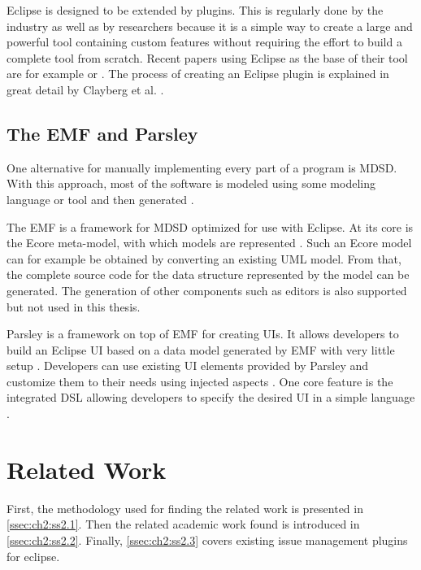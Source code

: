 Eclipse is designed to be extended by plugins. This is regularly done by the industry as well as by researchers 
because it is a simple way to create a large and powerful tool containing custom features 
without requiring the effort to build a complete tool from scratch. 
Recent papers using Eclipse as the base of their tool are for example \cite{segura2019extremo} or \cite{hajji2019onto2db}. 
The process of creating an Eclipse plugin is explained in great detail by Clayberg et al. \cite{clayberg2006eclipse}.

\subsection{The \acrlong{EMF} and \gls{Parsley} }
\label{ssec:ch2:ss1.4}
One alternative for manually implementing every part of a program is \gls{MDSD}.
With this approach, most of the software is modeled using some modeling language or tool and then generated \cite{volter2013model}. 

The \gls{EMF} is a framework for \gls{MDSD} optimized for use with \gls{Eclipse}.
At its core is the Ecore meta-model, with which models are represented \cite{steinberg2008emf}.
Such an Ecore model can for example be obtained by converting an existing \gls{UML} model.
From that, the complete source code for the data structure represented by the model can be generated.
The generation of other components such as editors is also supported but not used in this thesis.

\Gls{Parsley} is a framework on top of \gls{EMF} for creating \glspl{UI}.
It allows developers to build an \gls{Eclipse} \gls{UI} based on a data model generated by \gls{EMF} with very little setup \cite{bettini2014developing}.
Developers can use existing \gls{UI} elements provided by \gls{Parsley} and customize them to their needs using injected aspects  \cite{bettini2014developing}.
One core feature is the integrated \gls{DSL} allowing developers to specify the desired \gls{UI} in a simple language \cite{bettini2014developing}.

\section{Related Work}
\label{sec:ch2:s2}
First, the methodology used for finding the related work is presented in \cref{ssec:ch2:ss2.1}.
Then the related academic work found is introduced in \cref{ssec:ch2:ss2.2}.
Finally, \cref{ssec:ch2:ss2.3} covers existing issue management plugins for eclipse.

